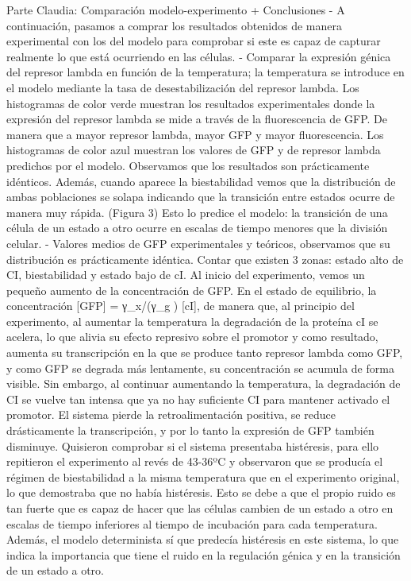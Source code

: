 Parte Claudia: Comparación modelo-experimento + Conclusiones
- A continuación, pasamos a comprar los resultados obtenidos de manera experimental con los del modelo para comprobar si este es capaz de capturar realmente lo que está ocurriendo en las células.
- Comparar la expresión génica del represor lambda en función de la temperatura; la temperatura se introduce en el modelo mediante la tasa de desestabilización del represor lambda. 
	Los histogramas de color verde muestran los resultados experimentales donde la expresión del represor lambda se mide a través de la fluorescencia de GFP. De manera que a mayor represor lambda, mayor GFP y mayor fluorescencia.
	Los histogramas de color azul muestran los valores de GFP y de represor lambda predichos por el modelo.
	Observamos que los resultados son prácticamente idénticos. 
	Además, cuando aparece la biestabilidad vemos que la distribución de ambas poblaciones se solapa indicando que la transición entre estados ocurre de manera muy rápida. (Figura 3) Esto lo predice el modelo: la transición de una célula de un estado a otro ocurre en escalas de tiempo menores que la división celular.
- Valores medios de GFP experimentales y teóricos, observamos que su distribución es prácticamente idéntica. 
	Contar que existen 3 zonas: estado alto de CI, biestabilidad y estado bajo de cI.
	Al inicio del experimento, vemos un pequeño aumento de la concentración de GFP. En el estado de equilibrio, la concentración [GFP] =  γ_x/(γ_g  ) [cI], de manera que, al principio del experimento, al aumentar la temperatura la degradación de la proteína cI se acelera, lo que alivia su efecto represivo sobre el promotor y como resultado, aumenta su transcripción en la que se produce tanto represor lambda como GFP, y como GFP se degrada más lentamente, su concentración se acumula de forma visible. Sin embargo, al continuar aumentando la temperatura, la degradación de CI se vuelve tan intensa que ya no hay suficiente CI para mantener activado el promotor.
El sistema pierde la retroalimentación positiva, se reduce drásticamente la transcripción, y por lo tanto la expresión de GFP también disminuye.
	Quisieron comprobar si el sistema presentaba histéresis, para ello repitieron el experimento al revés de 43-36ºC y observaron que se producía el régimen de biestabilidad a la misma temperatura que en el experimento original, lo que demostraba que no había histéresis. Esto se debe a que el propio ruido es tan fuerte que es capaz de hacer que las células cambien de un estado a otro en escalas de tiempo inferiores al tiempo de incubación para cada temperatura. Además, el modelo determinista sí que predecía histéresis en este sistema, lo que indica la importancia que tiene el ruido en la regulación génica y en la transición de un estado a otro.
